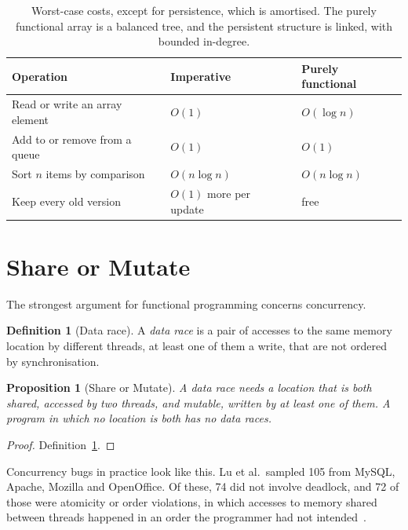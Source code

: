\documentclass[11pt]{article}
\let\oldsection\section
\renewcommand{\section}{\Needspace{0.25\textheight}\oldsection}
\newtheorem{proposition}[theorem]{Proposition}
\theoremstyle{definition}
\newtheorem{definition}[theorem]{Definition}
\theoremstyle{remark}
\begin{document}
\begin{table}[ht]
  \centering
  \begin{tabular}{@{}lll@{}}
    \toprule
    Operation & Imperative & Purely functional \\
    \midrule
    Read or write an array element & $O(1)$ & $O(\log n)$ \\
    Add to or remove from a queue & $O(1)$ & $O(1)$~\cite{hood} \\
    Sort $n$ items by comparison & $O(n\log n)$ & $O(n\log n)$ \\
    Keep every old version & $O(1)$ more per update~\cite{dsst} & free \\
    \bottomrule
  \end{tabular}
  \caption{Worst-case costs, except for persistence, which is
    amortised. The purely functional array is a balanced tree, and the
  persistent structure is linked, with bounded in-degree.}\label{tab:costs}
\end{table}

\section{Share or Mutate}\label{sec:shared}

The strongest argument for functional programming concerns concurrency.

\begin{definition}[Data race]\label{def:race}
  A \emph{data race} is a pair of accesses to the same memory location
  by different threads, at least one of them a write, that are not
  ordered by synchronisation.
\end{definition}

\begin{proposition}[Share or Mutate]\label{prop:share}
  A data race needs a location that is both \emph{shared}, accessed by
  two threads, and \emph{mutable}, written by at least one of them. A
  program in which no location is both has no data races.
\end{proposition}

\begin{proof}
  Definition~\ref{def:race}.
\end{proof}

Concurrency bugs in practice look like this. Lu et al.\ sampled 105 from
MySQL, Apache, Mozilla and OpenOffice. Of these, 74 did not involve
deadlock, and 72 of those were atomicity or order violations, in which
accesses to memory shared between threads happened in an order the
programmer had not intended~\cite{lu}.
\end{document}
